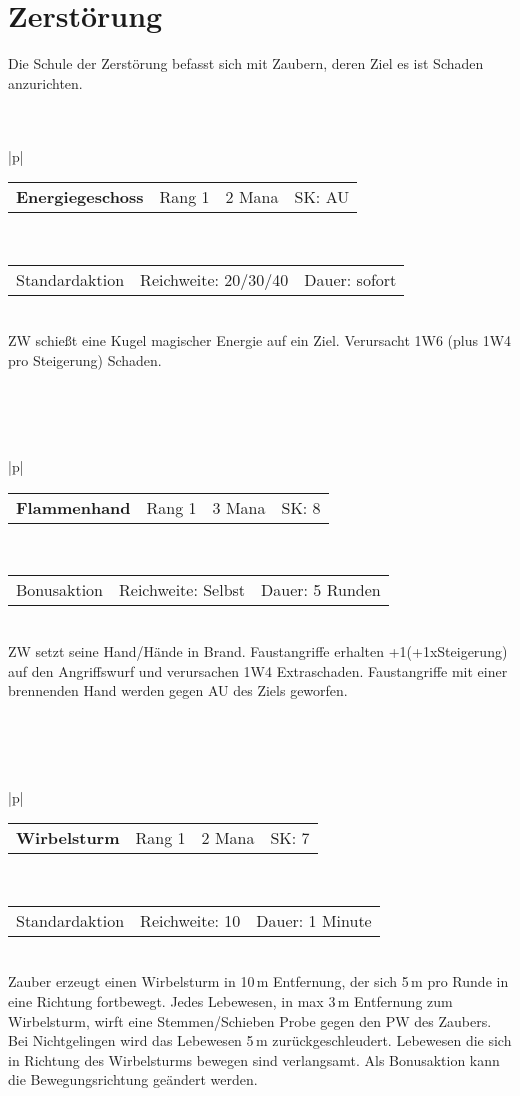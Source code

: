 \documentclass[../../Heldenanleitung2]{subfiles}
\begin{document}
\section{Zerstörung}

Die Schule der Zerstörung befasst sich mit Zaubern, deren Ziel es ist Schaden anzurichten.
\\\\\\
\begin{tabular}{|p{\textwidth}|}
\hline
\begin{tabularx}{\textwidth}{X|X|X|X}
\textbf{Energiegeschoss} & Rang 1 & 2 Mana & SK: AU
\end{tabularx} \\ \hline
\begin{tabularx}{\textwidth}{X|X|X}
Standardaktion & Reichweite: 20/30/40 & Dauer: sofort
\end{tabularx} \\ \hline
ZW schießt eine Kugel magischer Energie auf ein Ziel. Verursacht 1W6 (plus 1W4 pro Steigerung) Schaden.
\\ \hline
\end{tabular}
\\\\\\
\begin{tabular}{|p{\textwidth}|}
\hline
\begin{tabularx}{\textwidth}{X|X|X|X}
\textbf{Flammenhand} & Rang 1 & 3 Mana & SK: 8
\end{tabularx} \\ \hline
\begin{tabularx}{\textwidth}{X|X|X}
Bonusaktion & Reichweite: Selbst & Dauer: 5 Runden
\end{tabularx} \\ \hline
ZW setzt seine Hand/Hände in Brand. Faustangriffe erhalten +1(+1xSteigerung) auf den Angriffswurf und verursachen 1W4 Extraschaden. Faustangriffe mit einer brennenden Hand werden gegen AU des Ziels geworfen.
\\ \hline
\end{tabular}
\\\\\\
\begin{tabular}{|p{\textwidth}|}
\hline
\begin{tabularx}{\textwidth}{X|X|X|X}
\textbf{Wirbelsturm} & Rang 1 & 2 Mana & SK: 7
\end{tabularx} \\ \hline
\begin{tabularx}{\textwidth}{X|X|X}
Standardaktion & Reichweite: 10 & Dauer: 1 Minute
\end{tabularx} \\ \hline
Zauber erzeugt einen Wirbelsturm in 10\,m Entfernung, der sich 5\,m pro Runde in eine Richtung fortbewegt. Jedes Lebewesen, in max 3\,m Entfernung zum Wirbelsturm, wirft eine Stemmen/Schieben Probe gegen den PW des Zaubers. Bei Nichtgelingen wird das Lebewesen 5\,m zurückgeschleudert. Lebewesen die sich in Richtung des Wirbelsturms bewegen sind verlangsamt. Als Bonusaktion kann die Bewegungsrichtung geändert werden.
\\ \hline
\end{tabular}
\end{document}

